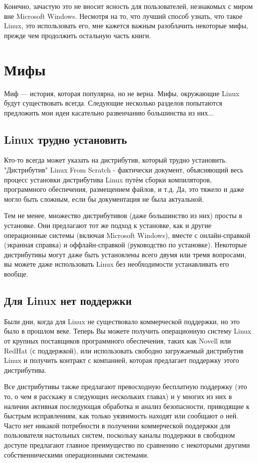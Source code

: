 \documentclass[10pt]{book}
\begin{document}
Конечно, зачастую это не вносит ясность для пользователей, незнакомых с миром вне Microsoft Windows. Несмотря на то, что лучший способ узнать, что такое Linux, это использовать его, мне кажется важным разоблачить некоторые мифы, прежде чем продолжить остальную часть книги.

\section*{Мифы}

Миф — история, которая популярна, но не верна.  Мифы, окружающие Linux будут существовать всегда. Следующие несколько разделов попытаются предложить мои идеи касательно развенчанию большинства из них...

\subsection{Linux трудно установить}

Кто-то всегда может указать на дистрибутив, который трудно установить. "Дистрибутив" Linux From Scratch - фактически документ, объясняющий весь процесс установки дистрибутива Linux путём сборки компиляторов, программного обеспечения, размещением файлов, и т.д. Да, это тяжело и даже могло быть сложным, если бы документация не была актуальной.

Тем не менее, множество дистрибутивов (даже большинство из них) просты в установке. Они предлагают тот же подход к установке, как и другие операционные системы (включая Microsoft Windows), вместе с онлайн-справкой (экранная справка) и оффлайн-справкой (руководство по установке). Некоторые дистрибутивы могут даже быть установлены всего двумя или тремя вопросами, вы можете даже использовать Linux без необходимости  устанавливать его вообще.

\subsection{Для Linux нет поддержки }

Были дни, когда для Linux не существовало коммерческой поддержки, но это было в прошлом веке. Теперь Вы можете получить операционную систему Linux от крупных поставщиков программного обеспечения, таких как Novell или RedHat (с поддержкой), или использовать свободно загружаемый дистрибутив Linux и получить контракт с компанией, которая предлагает поддержку этого дистрибутива.

Все дистрибутивы также предлагают превосходную бесплатную поддержку (это то, о чем я расскажу в следующих нескольких главах) и у многих из них в наличии активная последующая обработка и анализ безопасности, приводящие к быстрым исправлениям, как только уязвимость находят или сообщают о ней. Часто нет никакой потребности в получении коммерческой поддержки для пользователя настольных систем, поскольку каналы поддержки в свободном доступе предлагают главное преимущество по сравнению с некоторыми другими собственническими операционными системами.
\end{document}
